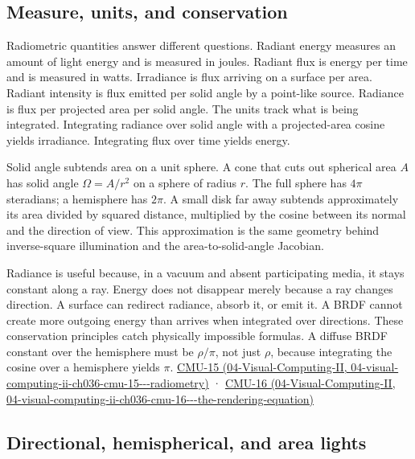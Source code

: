 \subsection{Measure, units, and conservation}\label{03-visual-computing-i-ch004-measure-units-and-conservation}

Radiometric quantities answer different questions. Radiant energy measures an amount of light energy and is measured in joules. Radiant flux is energy per time and is measured in watts. Irradiance is flux arriving on a surface per area. Radiant intensity is flux emitted per solid angle by a point-like source. Radiance is flux per projected area per solid angle. The units track what is being integrated. Integrating radiance over solid angle with a projected-area cosine yields irradiance. Integrating flux over time yields energy.

Solid angle subtends area on a unit sphere. A cone that cuts out spherical area \(A\) has solid angle \(\Omega=A/r^2\) on a sphere of radius \(r\). The full sphere has \(4\pi\) steradians; a hemisphere has \(2\pi\). A small disk far away subtends approximately its area divided by squared distance, multiplied by the cosine between its normal and the direction of view. This approximation is the same geometry behind inverse-square illumination and the area-to-solid-angle Jacobian.

Radiance is useful because, in a vacuum and absent participating media, it stays constant along a ray. Energy does not disappear merely because a ray changes direction. A surface can redirect radiance, absorb it, or emit it. A BRDF cannot create more outgoing energy than arrives when integrated over directions. These conservation principles catch physically impossible formulas. A diffuse BRDF constant over the hemisphere must be \(\rho/\pi\), not just \(\rho\), because integrating the cosine over a hemisphere yields \(\pi\). \href{../04-Visual-Computing-II/main.pdf\#nameddest=04-visual-computing-ii-ch036-cmu-15---radiometry}{CMU-15 (04-Visual-Computing-II, 04-visual-computing-ii-ch036-cmu-15-\/-\/-radiometry)} · \href{../04-Visual-Computing-II/main.pdf\#nameddest=04-visual-computing-ii-ch036-cmu-16---the-rendering-equation}{CMU-16 (04-Visual-Computing-II, 04-visual-computing-ii-ch036-cmu-16-\/-\/-the-rendering-equation)}

\subsection{Directional, hemispherical, and area lights}\label{03-visual-computing-i-ch004-directional-hemispherical-and-area-lights}


